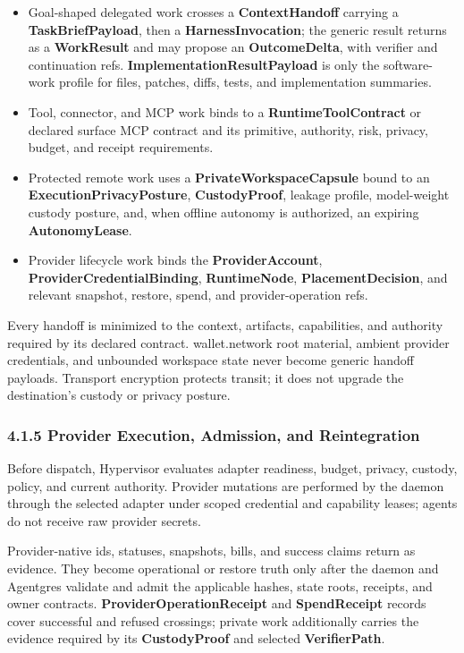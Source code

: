 \documentclass[
  11pt,
]{article}
\providecommand{\tightlist}{%
  \setlength{\itemsep}{0pt}\setlength{\parskip}{0pt}}
\begin{document}
\begin{itemize}
\tightlist
\item
  Goal-shaped delegated work crosses a \textbf{ContextHandoff} carrying a
  \textbf{TaskBriefPayload}, then a \textbf{HarnessInvocation}; the generic
  result returns as a \textbf{WorkResult} and may propose an
  \textbf{OutcomeDelta}, with verifier and continuation refs.
  \textbf{ImplementationResultPayload} is only the software-work profile for
  files, patches, diffs, tests, and implementation summaries.
\item
  Tool, connector, and MCP work binds to a \textbf{RuntimeToolContract} or
  declared surface MCP contract and its primitive, authority, risk, privacy,
  budget, and receipt requirements.
\item
  Protected remote work uses a \textbf{PrivateWorkspaceCapsule} bound to an
  \textbf{ExecutionPrivacyPosture}, \textbf{CustodyProof}, leakage profile,
  model-weight custody posture, and, when offline autonomy is authorized, an
  expiring \textbf{AutonomyLease}.
\item
  Provider lifecycle work binds the \textbf{ProviderAccount},
  \textbf{ProviderCredentialBinding}, \textbf{RuntimeNode},
  \textbf{PlacementDecision}, and relevant snapshot, restore, spend, and
  provider-operation refs.
\end{itemize}

Every handoff is minimized to the context, artifacts, capabilities, and
authority required by its declared contract. wallet.network root material,
ambient provider credentials, and unbounded workspace state never become
generic handoff payloads. Transport encryption protects transit; it does not
upgrade the destination's custody or privacy posture.

\hypertarget{provider-execution-admission-and-reintegration}{%
\subsubsection{4.1.5 Provider Execution, Admission, and
Reintegration}\label{provider-execution-admission-and-reintegration}}

Before dispatch, Hypervisor evaluates adapter readiness, budget, privacy,
custody, policy, and current authority. Provider mutations are performed by the
daemon through the selected adapter under scoped credential and capability
leases; agents do not receive raw provider secrets.

Provider-native ids, statuses, snapshots, bills, and success claims return as
evidence. They become operational or restore truth only after the daemon and
Agentgres validate and admit the applicable hashes, state roots, receipts, and
owner contracts. \textbf{ProviderOperationReceipt} and \textbf{SpendReceipt}
records cover successful and refused crossings; private work additionally
carries the evidence required by its \textbf{CustodyProof} and selected
\textbf{VerifierPath}.
\end{document}
